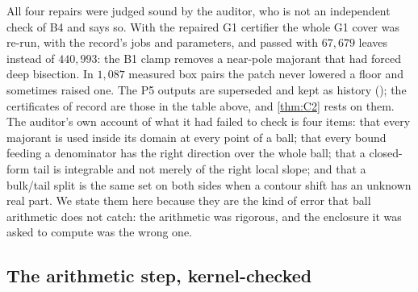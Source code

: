 \documentclass[11pt]{article}
\theoremstyle{definition}
\begin{document}
All four repairs were judged sound by the auditor, who is not an independent check of B4 and says so. With the repaired G1 certifier the whole G1 cover was re-run, with the record's jobs and parameters, and passed with $67{,}679$ leaves instead of $440{,}993$: the B1 clamp removes a near-pole majorant that had forced deep bisection. In $1{,}087$ measured box pairs the patch never lowered a floor and sometimes raised one. The P5 outputs are superseded and kept as history (); the certificates of record are those in the table above, and \cref{thm:C2} rests on them. The auditor's own account of what it had failed to check \cite[REVIEW\_Y3 \S7]{dq1records} is four items: that every majorant is used inside its domain at every point of a ball; that every bound feeding a denominator has the right direction over the whole ball; that a closed-form tail is integrable and not merely of the right local slope; and that a bulk/tail split is the same set on both sides when a contour shift has an unknown real part. We state them here because they are the kind of error that ball arithmetic does not catch: the arithmetic was rigorous, and the enclosure it was asked to compute was the wrong one.

\subsection{The arithmetic step, kernel-checked}\label{sec:v2lean}
\end{document}
